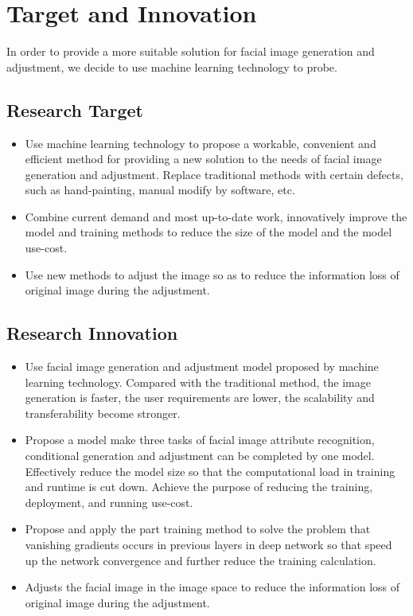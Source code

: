 \section{Target and Innovation}

In order to provide a more suitable solution for facial image generation and adjustment,
    we decide to use machine learning technology to probe.

\subsection{Research Target}
\begin{itemize}
\item Use machine learning technology to propose a workable,
    convenient and efficient method for providing a new solution to the needs of facial image generation and adjustment.
    Replace traditional methods with certain defects, such as hand-painting, manual modify by software, etc.
\item Combine current demand and most up-to-date work, 
    innovatively improve the model and training methods to reduce the size of the model and the model use-cost.
\item Use new methods to adjust the image so as to reduce the information loss of original image during the adjustment.
\end{itemize}
\subsection{Research Innovation}
\begin{itemize}
\item Use facial image generation and adjustment model proposed by machine learning technology.
    Compared with the traditional method, the image generation is faster, the user requirements are lower,
    the scalability and transferability become stronger.
\item Propose a model make three tasks of facial image attribute recognition,
    conditional generation and adjustment can be completed by one model.
    Effectively reduce the model size so that the computational load in training and runtime is cut down.
    Achieve the purpose of reducing the training, deployment, and running use-cost.
\item Propose and apply the part training method to solve the problem that vanishing gradients occurs in previous layers in deep network so that speed up the network convergence and further reduce the training calculation.

\item Adjusts the facial image in the image space to reduce the information loss of original image during the adjustment.
\end{itemize}
